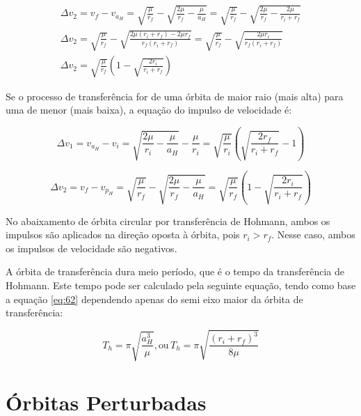 \begin{equation}
\begin{gathered}
\Delta v_2=v_f-v_{a_H}=\sqrt{\frac{\mu}{r_f}}-\sqrt{\frac{2 \mu}{r_f}-\frac{\mu}{a_H}}=\sqrt{\frac{\mu}{r_f}}-\sqrt{\frac{2 \mu}{r_f}-\frac{2 \mu}{r_i+r_f}} \\
\Delta v_2=\sqrt{\frac{\mu}{r_f}}-\sqrt{\frac{2 \mu\left(r_i+r_f\right)-2 \mu r_f}{r_f\left(r_i+r_f\right)}}=\sqrt{\frac{\mu}{r_f}}-\sqrt{\frac{2 \mu r_i}{r_f\left(r_i+r_f\right)}} \\
\Delta v_2=\sqrt{\frac{\mu}{r_f}}\left(1-\sqrt{\frac{2 r_i}{r_i+r_f}}\right)
\label{eq:delta2}
\end{gathered}
\end{equation}


Se o processo de transferência for de uma órbita de maior raio (mais alta) para uma de menor (mais baixa), a equação do impulso de velocidade é:

\begin{equation}
\Delta v_1=v_{a_H}-v_i=\sqrt{\frac{2 \mu}{r_i}-\frac{\mu}{a_H}}-\frac{\mu}{r_i}=\sqrt{\frac{\mu}{r_i}}\left(\sqrt{\frac{2 r_f}{r_i+r_f}}-1\right)
\label{eq:delta1fin}
\end{equation}

\begin{equation}
\Delta v_2=v_f-v_{p_H}=\sqrt{\frac{\mu}{r_f}}-\sqrt{\frac{2 \mu}{r_f}-\frac{\mu}{a_H}}=\sqrt{\frac{\mu}{r_f}}\left(1-\sqrt{\frac{2 r_i}{r_i+r_f}}\right)
\label{eq:delta2fin}
\end{equation}

\par No abaixamento de órbita circular por transferência de Hohmann, ambos os impulsos são aplicados na direção oposta à órbita, pois $r_i>r_f$. Nesse caso, ambos os impulsos de velocidade são negativos. 

\par A órbita de transferência dura meio período, que é o tempo da transferência de Hohmann. Este tempo pode ser calculado pela seguinte equação, tendo como base a equação \ref{eq:62} dependendo apenas do semi eixo maior da órbita de transferência:

\begin{equation}
T_h=\pi\sqrt{\frac{a_H^3}{\mu}},\text{ou} \, T_h=\pi\sqrt{\frac{(r_i+r_f)^3}{8\mu}}
\end{equation}



\section{Órbitas Perturbadas}
